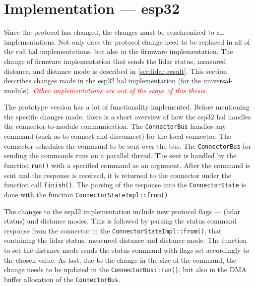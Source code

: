 \documentclass[
  digital,     %
  oneside,     %
  nosansbold,  %
  nocolorbold, %
  nolof,         %
  nolot,         %
]{fithesis4}
\newcommand{\TODO}[1]{\textcolor{red}{\textit{#1}}}
\newcommand{\TODOLIST}[1]{}
\begin{document}
{{{\section{ Implementation --- esp32 }
\TODOLIST{
\begin{itemize}
    \item Apply changes from interface --- lidar status, distance and \TODO{distance modes}
    \item Issue $\rightarrow$ status is not being updated $\rightarrow$ Needed to implement poller
\end{itemize}
}

Since the protocol has changed, the changes must be synchronized to all implementations. Not only does the protocol change need to be replaced in all of the \acrshort{rofi} \acrshort{hal} implementations, but also in the firmware implementation. The change of firmware implementation that sends the \acrshort{lidar} status, measured distance, and distance mode is described in \autoref{sec:lidar-result}. This section describes changes made in the esp32 \acrshort{hal} implementation (for the \gls{universal-module}). \TODO{Other implementations are out of the scope of this thesis.}

The prototype version has a lot of functionality implemented. Before mentioning the specific changes made, there is a short overview of how the esp32 \acrshort{hal} handles the connector-to-module communication. The \lstinline|ConnectorBus| handles any command (such as to connect and disconnect) for the local connector. The connector schedules the command to be sent over the bus. The \lstinline|ConnectorBus| for sending the commands runs on a parallel thread. The sent is handled by the function \lstinline|run()| with a specified command as an argument. After the command is sent and the response is received, it is returned to the connector under the function call \lstinline|finish()|. The parsing of the response into the \lstinline|ConnectorState| is done with the function \lstinline|ConnectorStateImpl::from()|.

The changes to the esp32 implementation include new protocol flags --- (\acrshort{lidar} status) and distance modes. This is followed by parsing the status command response from the connector in the \lstinline|ConnectorStateImpl::from()|, that containing the \acrshort{lidar} status, measured distance and distance mode. The function to set the distance mode sends the status command with flags set accordingly to the chosen value. As last, due to the change in the size of the command, the change needs to be updated in the \lstinline|ConnectorBus::run()|, but also in the DMA buffer allocation of the \lstinline|ConnectorBus|.

}}}
\end{document}

